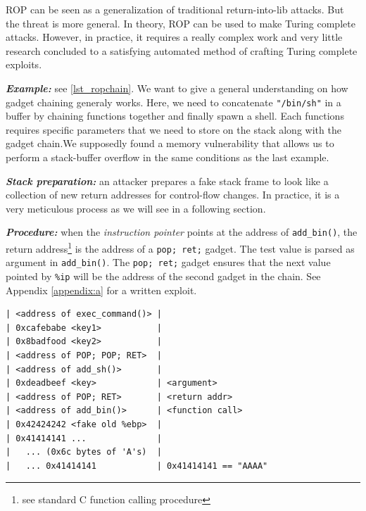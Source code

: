 \documentclass[10pt,twocolumn]{article}
\begin{document}
ROP can be seen as a generalization of traditional return-into-lib attacks. But
the threat is more general. In theory, ROP can be used to make Turing complete
attacks. However, in practice, it requires a really complex work and very
little research concluded to a satisfying automated method of crafting Turing complete
exploits.

\textbf{\textit{Example:}} see \autoref{lst_ropchain}. We want to give a
general understanding on how gadget chaining generaly works. Here, we need to
concatenate \texttt{"/bin/sh"} in a buffer by chaining functions together and
finally spawn a shell. Each functions requires specific parameters that we need
to store on the stack along with the gadget chain.We supposedly found a memory
vulnerability that allows us to perform a stack-buffer overflow in the same
conditions as the last example.

\textbf{\textit{Stack preparation:}} an attacker prepares a fake stack frame to
look like a collection of new return addresses for control-flow changes. In
practice, it is a very meticulous process as we will see in a following
section.

\textbf{\textit{Procedure:}} when the \textit{instruction pointer} points at
the address of \texttt{add\_bin()}, the return address\footnote{see standard C
 function calling procedure} is the address of a
 \texttt{pop; ret;} gadget. The test value is parsed as argument in
 \texttt{add\_bin()}. The \texttt{pop; ret;} gadget ensures that the next value
 pointed by \texttt{\%ip} will be the address of the second gadget in the
 chain. See Appendix \ref{appendix:a} for a written exploit.



\begin{lstlisting}[float,aboveskip=\bigskipamount,belowskip=\medskipamount,caption=Stack
prepared with a ROP chain]
| <address of exec_command()> |
| 0xcafebabe <key1>           |
| 0x8badfood <key2>           |
| <address of POP; POP; RET>  |
| <address of add_sh()>       |
| 0xdeadbeef <key>            | <argument>
| <address of POP; RET>       | <return addr>
| <address of add_bin()>      | <function call>
| 0x42424242 <fake old %ebp>  |
| 0x41414141 ...              |
|   ... (0x6c bytes of 'A's)  |
|   ... 0x41414141            | 0x41414141 == "AAAA"
\end{lstlisting}
\end{document}
